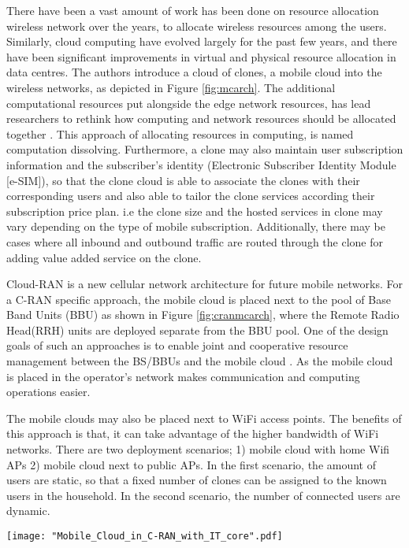 \documentclass[12pt,journal,compsoc, onecolumn]{IEEEtran}
\begin{document}
There have been a vast amount of work has been done on resource allocation wireless network over the years, to allocate wireless resources among the users. Similarly, cloud computing have evolved largely for the past few years, and there have been significant improvements in virtual and physical resource allocation in data centres.
The authors introduce a cloud of clones, a mobile cloud into the wireless networks, as depicted in Figure \ref{fig:mcarch}. The additional computational resources put alongside the edge network resources, has lead researchers to rethink how computing and network resources should be allocated together \cite{6923537}. This approach of allocating resources in computing, is named computation dissolving. Furthermore, a clone may also maintain user subscription information and the subscriber's identity (Electronic Subscriber Identity Module [e-SIM]), so that the clone cloud is able to associate the clones with their corresponding users and also able to tailor the clone services according their subscription price plan. i.e the clone size and the hosted services in clone may vary depending on the type of mobile subscription. Additionally, there may be cases where all inbound and outbound traffic are routed through the clone for adding value added service on the clone.

Cloud-RAN \cite{chenc} is a new cellular network architecture for future mobile networks. For a C-RAN specific approach, the mobile cloud is placed next to the pool of Base Band Units (BBU) as shown in Figure \ref{fig:cranmcarch}, where the Remote Radio Head(RRH) units are deployed separate from the BBU pool. One of the design goals of such an approaches is to enable joint and cooperative resource management between the BS/BBUs and the mobile cloud \cite{ikwangj:2015TOC}. As the mobile cloud is placed in the operator's network makes communication and computing operations easier. 

The mobile clouds may also be placed next to WiFi access points. The benefits of this approach is that, it can take advantage of the higher bandwidth of WiFi networks. There are two deployment scenarios; 1)  mobile cloud with home Wifi APs 2) mobile cloud next to public APs. In the first scenario, the amount of users are static, so that a fixed number of clones can be assigned to the known users in the household. In the second scenario, the number of connected users are dynamic.

\begin{figure*}[ht]
\centering
\texttt{[image: "Mobile\_Cloud\_in\_C-RAN\_with\_IT\_core".pdf]}
\caption{\label{fig:cranmcarch} Mobile Cloud in C-RAN architecture}
\end{figure*} 
\end{document}
